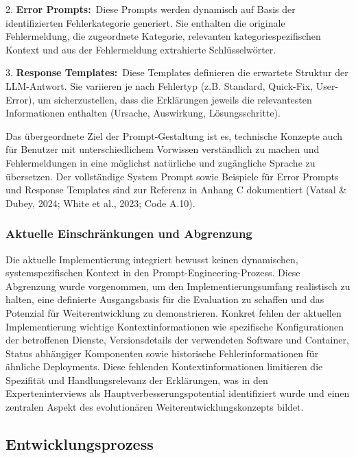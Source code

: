 \documentclass[
  a4paper,
  12pt,
  oneside,
  open=any,
  BCOR=12mm,
  DIV=14,
  parskip=half*,
  headsepline,
  footsepline,
  pointlessnumbers,
  liststotoc,
  numbers=noenddot,
  listof=totoc]{scrartcl}
\begin{document}
2. \textbf{Error Prompts:}~Diese Prompts werden dynamisch auf Basis der
identifizierten Fehlerkategorie generiert. Sie enthalten die originale
Fehlermeldung, die zugeordnete Kategorie, relevanten
kategoriespezifischen Kontext und aus der Fehlermeldung extrahierte
Schlüsselwörter.

3. \textbf{Response Templates:}~Diese Templates definieren die erwartete
Struktur der LLM-Antwort. Sie variieren je nach Fehlertyp (z.B.
Standard, Quick-Fix, User-Error), um sicherzustellen, dass die
Erklärungen jeweils die relevantesten Informationen enthalten (Ursache,
Auswirkung, Lösungsschritte).

Das übergeordnete Ziel der Prompt-Gestaltung ist es, technische Konzepte
auch für Benutzer mit unterschiedlichem Vorwissen verständlich zu machen
und Fehlermeldungen in eine möglichst natürliche und zugängliche Sprache
zu übersetzen. Der vollständige System Prompt sowie Beispiele für Error
Prompts und Response Templates sind zur Referenz in Anhang C
dokumentiert (Vatsal \& Dubey, 2024; White et al., 2023; Code A.10).

\subsubsection{Aktuelle Einschränkungen und
Abgrenzung}\label{aktuelle-einschruxe4nkungen-und-abgrenzung}

Die aktuelle Implementierung integriert bewusst keinen dynamischen,
systemspezifischen Kontext in den Prompt-Engineering-Prozess. Diese
Abgrenzung wurde vorgenommen, um den Implementierungsumfang realistisch
zu halten, eine definierte Ausgangsbasis für die Evaluation zu schaffen
und das Potenzial für Weiterentwicklung zu demonstrieren. Konkret fehlen
der aktuellen Implementierung wichtige Kontextinformationen wie
spezifische Konfigurationen der betroffenen Dienste, Versionsdetails der
verwendeten Software und Container, Status abhängiger Komponenten sowie
historische Fehlerinformationen für ähnliche Deployments. Diese
fehlenden Kontextinformationen limitieren die Spezifität und
Handlungsrelevanz der Erklärungen, was in den Experteninterviews als
Hauptverbesserungspotential identifiziert wurde und einen zentralen
Aspekt des evolutionären Weiterentwicklungskonzepts bildet.

\subsection{Entwicklungsprozess}\label{entwicklungsprozess}
\end{document}
